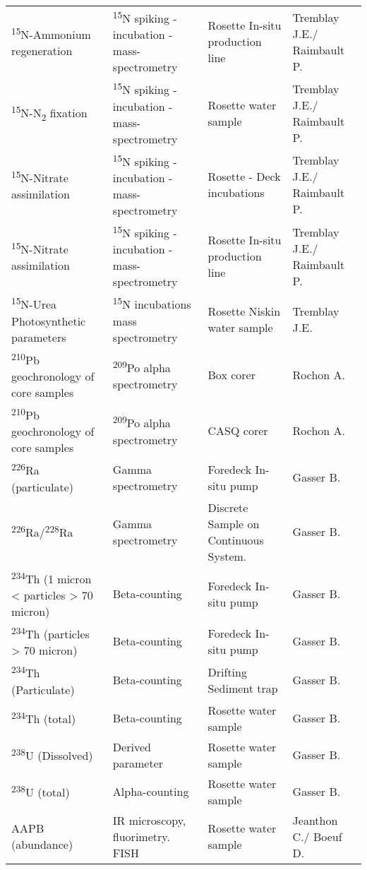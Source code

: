\begin{longtable}[t]{llll}
\addlinespace
\textsuperscript{15}N-Ammonium regeneration & \textsuperscript{15}N spiking - incubation - mass-spectrometry & Rosette In-situ production line & Tremblay J.E./ Raimbault P.\\
\textsuperscript{15}N-N\textsubscript{2} fixation & \textsuperscript{15}N spiking - incubation - mass-spectrometry & Rosette water sample & Tremblay J.E./ Raimbault P.\\
\textsuperscript{15}N-Nitrate assimilation & \textsuperscript{15}N spiking - incubation - mass-spectrometry & Rosette - Deck incubations & Tremblay J.E./ Raimbault P.\\
\textsuperscript{15}N-Nitrate assimilation & \textsuperscript{15}N spiking - incubation - mass-spectrometry & Rosette In-situ production line & Tremblay J.E./ Raimbault P.\\
\textsuperscript{15}N-Urea Photosynthetic parameters & \textsuperscript{15}N incubations mass spectrometry & Rosette Niskin water sample & Tremblay J.E.\\
\addlinespace
\textsuperscript{210}Pb geochronology of core samples & \textsuperscript{209}Po alpha spectrometry & Box corer & Rochon A.\\
\textsuperscript{210}Pb geochronology of core samples & \textsuperscript{209}Po alpha spectrometry & CASQ corer & Rochon A.\\
\textsuperscript{226}Ra (particulate) & Gamma spectrometry & Foredeck In-situ pump & Gasser B.\\
\textsuperscript{226}Ra/\textsuperscript{228}Ra & Gamma spectrometry & Discrete Sample on Continuous System. & Gasser B.\\
\textsuperscript{234}Th (1 micron < particles > 70 micron) & Beta-counting & Foredeck In-situ pump & Gasser B.\\
\addlinespace
\textsuperscript{234}Th (particles > 70 micron) & Beta-counting & Foredeck In-situ pump & Gasser B.\\
\textsuperscript{234}Th (Particulate) & Beta-counting & Drifting Sediment trap & Gasser B.\\
\textsuperscript{234}Th (total) & Beta-counting & Rosette water sample & Gasser B.\\
\textsuperscript{238}U (Dissolved) & Derived parameter & Rosette water sample & Gasser B.\\
\textsuperscript{238}U (total) & Alpha-counting & Rosette water sample & Gasser B.\\
\addlinespace
AAPB (abundance) & IR microscopy, fluorimetry. FISH & Rosette water sample & Jeanthon C./ Boeuf D.\\

\end{longtable}
